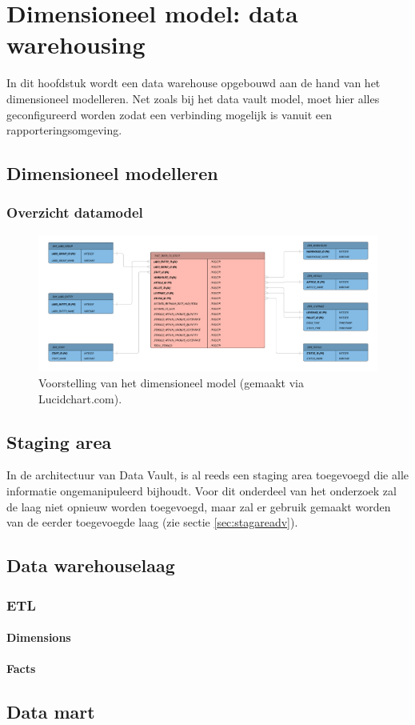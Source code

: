 
\chapter{Dimensioneel model: data warehousing}
\label{ch:dimmodel}
In dit hoofdstuk wordt een data warehouse opgebouwd aan de hand van het dimensioneel modelleren. Net zoals bij het data vault model, moet hier alles geconfigureerd worden zodat een verbinding mogelijk is vanuit een rapporteringsomgeving.

\section{Dimensioneel modelleren}

\subsection{Overzicht datamodel}
\begin{figure}[h]
	\centering
	\includegraphics[scale=0.5]{../images/Dimensioneelmodel.png}
	\caption{Voorstelling van het dimensioneel model (gemaakt via Lucidchart.com).}
	\label{fig:dpa}
\end{figure}

\section{Staging area}
In de architectuur van Data Vault, is al reeds een staging area toegevoegd die alle informatie ongemanipuleerd bijhoudt. Voor dit onderdeel van het onderzoek zal de laag niet opnieuw worden toegevoegd, maar zal er gebruik gemaakt worden van de eerder toegevoegde laag (zie sectie \ref{sec:stagareadv}).

\section{Data warehouselaag}

\subsection{ETL}

\subsubsection{Dimensions}

\subsubsection{Facts}

\section{Data mart}
